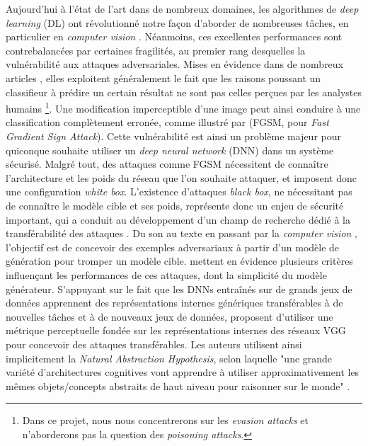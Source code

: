 \documentclass{article}
\begin{document}
Aujourd'hui à l'état de l'art dans de nombreux domaines, les algorithmes de \textit{deep learning} (DL) ont révolutionné notre façon d'aborder de nombreuses tâches, en particulier en \textit{computer vision} \cite{He2015DelvingDI}.
Néanmoins, ces excellentes performances sont contrebalancées par certaines fragilités, au premier rang desquelles la vulnérabilité aux attaques adversariales. Mises en évidence dans de nombreux articles \cite{Kurakin2016AdversarialML,Goodfellow2014ExplainingAH}, elles exploitent généralement le fait que les raisons poussant un classifieur à prédire un certain résultat ne sont pas celles perçues par les analystes humains \footnote{Dans ce projet, nous nous concentrerons sur les \textit{evasion attacks} et n'aborderons pas la question des \textit{poisoning attacks}.}. Une modification imperceptible d'une image peut ainsi conduire à une classification complètement erronée, comme illustré par \citet{Goodfellow2014ExplainingAH} (FGSM, pour \textit{Fast Gradient Sign Attack}). Cette vulnérabilité est ainsi un problème majeur pour quiconque souhaite utiliser un \textit{deep neural network} (DNN) dans un système sécurisé. Malgré tout, des attaques comme FGSM nécessitent de connaître l'architecture et les poids du réseau que l'on souhaite attaquer, et imposent donc une configuration \textit{white box}. L'existence d'attaques \textit{black box}, ne nécessitant pas de connaître le modèle cible et ses poids, représente donc un enjeu de sécurité important, qui a conduit au développement d'un champ de recherche dédié à la transférabilité des attaques \cite{Liu2016DelvingIT}. Du son \cite{Subramanian2019RobustnessOA, Subramanian2020ASO} au texte \cite{Yuan2020OnTT} en passant par la \textit{computer vision} \cite{Naseer2019CrossDomainTO}, l'objectif est de concevoir des exemples adversariaux à partir d'un modèle de génération pour tromper un modèle cible. \citet{Demontis2018WhyDA} mettent en évidence plusieurs critères influençant les performances de ces attaques, dont la simplicité du modèle générateur. S'appuyant sur le fait que les DNNs entraînés sur de grands jeux de données apprennent des représentations internes génériques transférables à de nouvelles tâches et à de nouveaux jeux de données, \citet{Naseer2018TaskgeneralizableAA} proposent d'utiliser une métrique perceptuelle fondée sur les représentations internes des réseaux VGG pour concevoir des attaques transférables. Les auteurs utilisent ainsi implicitement la \textit{Natural Abstraction Hypothesis}, selon laquelle "une grande variété d'architectures cognitives vont apprendre à utiliser approximativement les mêmes objets/concepts abstraits de haut niveau pour raisonner sur le monde" \cite{NatAbsHyp}. \\
\end{document}
